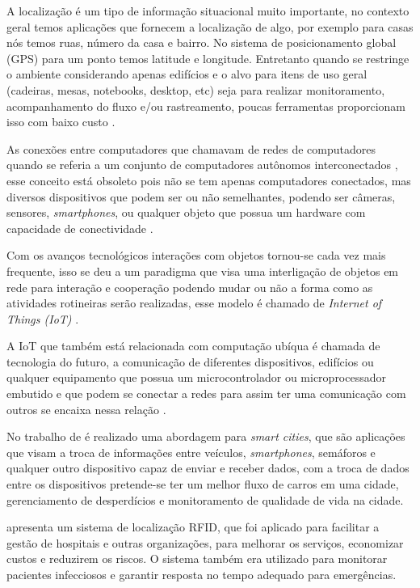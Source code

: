 

A localização é um tipo de informação situacional muito importante, no contexto geral temos aplicações que fornecem a
localização de algo, por exemplo para casas nós temos ruas, número da casa e bairro. No sistema de posicionamento global (GPS) para um ponto temos latitude e longitude. Entretanto quando se restringe o ambiente considerando apenas edifícios e o
alvo para itens de uso geral (cadeiras, mesas, notebooks, desktop, etc) seja para realizar monitoramento, acompanhamento do
fluxo e/ou rastreamento, poucas ferramentas proporcionam isso com baixo custo \cite{rfid2009review}.


As conexões entre computadores que chamavam de
redes de computadores quando se referia a um conjunto de computadores autônomos interconectados \cite{tenenbaum2002},
esse conceito está obsoleto pois não se tem apenas computadores conectados, mas diversos dispositivos que podem ser ou
não semelhantes, podendo ser câmeras, sensores, \textit{smartphones}, ou qualquer objeto que possua um
hardware com capacidade de conectividade \cite{iot2016SBRC}.


Com os avanços tecnológicos interações com objetos tornou-se cada vez mais frequente, isso se deu a um paradigma
que visa uma interligação de objetos em rede para interação e cooperação podendo mudar ou não a forma como as atividades
rotineiras serão realizadas, esse modelo é chamado de \textit{Internet of Things (IoT)} \cite{realtimeRFID2016}.


A IoT que também está relacionada com computação ubíqua é chamada de tecnologia do futuro, a comunicação de diferentes dispositivos,
edifícios ou qualquer equipamento que possua um microcontrolador ou microprocessador embutido e que podem se conectar a
redes para assim ter uma comunicação com outros se encaixa nessa relação
\cite{mechanismRFID2006}.


No trabalho de  é realizado uma abordagem para \textit{smart cities}, que são
aplicações que visam a troca de informações entre veículos, \textit{smartphones}, semáforos e qualquer
outro dispositivo capaz de enviar e receber dados, com a troca de dados entre os dispositivos pretende-se
ter um melhor fluxo de carros em uma cidade, gerenciamento de desperdícios e monitoramento de qualidade de vida na cidade.


 apresenta um sistema de localização RFID, que foi aplicado para facilitar a gestão de
hospitais e outras organizações, para melhorar os serviços, economizar custos e reduzirem os riscos. O sistema também era
utilizado para monitorar pacientes infecciosos e garantir resposta no tempo adequado para emergências.


